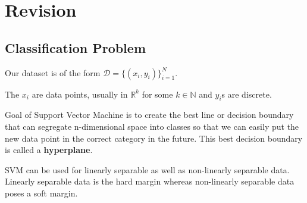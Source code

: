 \documentclass[12pt]{article}
\begin{document}
	\MakeScribeTop



\section{Revision}

\subsection{Classification Problem}

Our dataset is of the form $\mathcal{D}=\{(x_i,y_i)\}_{i=1}^N$. 

\noindent The $x_i$ are data points, usually in $\mathbb{R}^k$ for some $k \in \mathbb{N}$ and  $y_i$s are discrete.

\vspace{10pt}

\noindent Goal of Support Vector Machine is to create the best line or decision boundary that can segregate n-dimensional space into classes so that we can easily put the new data point in the correct category in the future. This best decision boundary is called a \textbf{hyperplane}. 


\vspace{10pt}

\noindent SVM can be used for linearly separable as well as non-linearly separable data. Linearly separable data is the hard margin whereas non-linearly separable data poses a soft margin.

\end{document}
